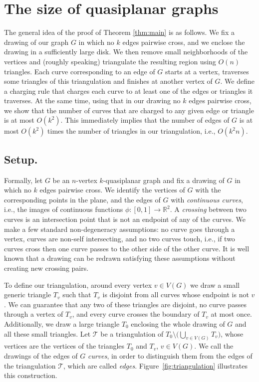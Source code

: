 \documentclass[11pt]{amsart}
\theoremstyle{definition}
\newcommand{\cT}{\mathcal{T}}
\begin{document}
\section{The size of quasiplanar graphs}

The general idea of the proof of Theorem \ref{thm:main} is as follows. 
We fix a drawing of our graph $G$ in which no $k$ edges pairwise cross, and we enclose the drawing in a sufficiently large disk.
We then remove small neighborhoods of the vertices and (roughly speaking) triangulate the resulting region using $O(n)$ triangles. 
Each curve corresponding to an edge of $G$ starts at a vertex, traverses some triangles of this triangulation and finishes at another vertex of $G$. 
We define a charging rule that charges each curve to at least one of the edges or triangles it traverses. 
At the same time, using that in our drawing no $k$ edges pairwise cross, we show that the number of curves that are charged to any given edge or triangle is at most $O(k^2)$. 
This immediately implies that the number of edges of $G$ is at most $O(k^2)$ times the number of triangles in our triangulation, i.e., $O(k^2n)$.

\subsection{Setup.}
Formally, let $G$ be an $n$-vertex $k$-quasiplanar graph and fix a drawing of $G$ in which no $k$ edges pairwise cross. 
We identify the vertices of $G$ with the corresponding points in the plane, and the edges of $G$ with \emph{continuous curves}, i.e., the images of continuous functions $\phi:[0,1]\rightarrow \mathbb{R}^2$. 
A \emph{crossing} between two curves is an intersection point that is not an endpoint of any of the curves. We make a few standard non-degeneracy assumptions: no curve goes through a vertex, curves are non-self intersecting, and no two curves touch, i.e., if two curves cross then one curve passes to the other side of the other curve. 
It is well known that a drawing can be redrawn satisfying these assumptions without creating new crossing pairs.

To define our triangulation, around every vertex $v\in V(G)$ we draw a small generic triangle $T_v$ such that $T_v$ is disjoint from all curves whose endpoint is not $v$.
We can guarantee that any two of these triangles are disjoint, no curve passes through a vertex of $T_v$, and every curve crosses the boundary of $T_v$ at most once. 
Additionally, we draw a large triangle $T_0$ enclosing the whole drawing of $G$ and all these small triangles. Let $\cT$ be a triangulation of $T_0\setminus \big(\bigcup_{v\in V(G)} T_v\big)$, whose vertices are the vertices of the triangles $T_0$ and $T_v$, $v\in V(G)$. 
We call the drawings of the edges of $G$ \textit{curves}, in order to distinguish them from the edges of the triangulation $\cT$, which are called \textit{edges}. 
Figure~\ref{fig:triangulation} illustrates this construction.
\end{document}
